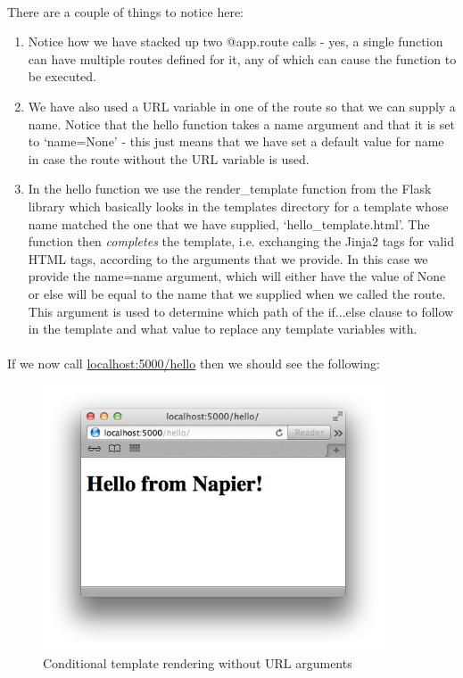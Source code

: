 \documentclass[12pt, a4paper, twoside]{book}
\begin{document}
\paragraph{} There are a couple of things to notice here:
\begin{enumerate}
\item Notice how we have stacked up two @app.route calls - yes, a single function can have multiple routes defined for it, any of which can cause the function to be executed.
\item We have also used a URL variable in one of the route so that we can supply a name. Notice that the hello function takes a name argument and that it is set to `name=None' - this just means that we have set a default value for name in case the route without the URL variable is used.
\item In the hello function we use the render\_template function from the Flask library which basically looks in the templates directory for a template whose name matched the one that we have supplied, `hello\_template.html'. The function then \emph{completes} the template, i.e. exchanging the Jinja2 tags for valid HTML tags, according to the arguments that we provide. In this case we provide the name=name argument, which will either have the value of None or else will be equal to the name that we supplied when we called the route. This argument is used to determine which path of the if...else clause to follow in the template and what value to replace any template variables with.
\end{enumerate}

\paragraph{} If we now call \url{localhost:5000/hello} then we should see the following:

\begin{figure}[H]
\centering
\includegraphics[width=0.9\textwidth]{images/flask-template-conditional-no-arg}
\caption{Conditional template rendering without URL arguments}
\label{fig:flask-template-conditional-no-arg}
\end{figure}
\end{document}
